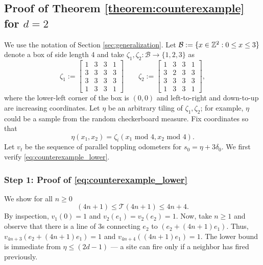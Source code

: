 \documentclass[12pt]{amsart}
\begin{document}
\subsection{Proof of Theorem \ref{theorem:counterexample} for \texorpdfstring{$d=2$}{d=2}} \label{sec:counterexample_2D}
We use the notation of Section \ref{sec:generalization}.  Let $\mathcal{B} := \{ x \in \mathbb{Z}^2 : 0 \leq x \leq 3\}$
denote a box of side length 4 and take $\zeta_1,\zeta_2: \mathcal{B} \to \{1,2, 3\}$ as
\[
\zeta_1 := 
\begin{bmatrix}
1 & 3 & 3 & 1 \\
3 & 3 & 3 & 3 \\
3 & 3 & 3 & 3  \\
1 & 3 & 3 & 1
\end{bmatrix}
\qquad 
\zeta_2 := 
\begin{bmatrix}
1 & 3 & 3 & 1 \\
3 & 2 & 3 & 3 \\
3 & 3 & 3 & 3  \\
1 & 3 & 3 & 1
\end{bmatrix}, 
\]
where the lower-left corner of the box is $(0,0)$ and left-to-right and down-to-up are increasing coordinates.
Let $\eta$ be an arbitrary tiling of $\zeta_1, \zeta_2$; for example, $\eta$ could be a sample from the 
random checkerboard measure. Fix coordinates so that 
\[
\eta(x_1, x_2) = \zeta_i(x_1 \mbox{ mod }  4, x_2  \mbox{ mod }  4).
\]
Let $v_t$ be the sequence of parallel toppling odometers for $s_0 = \eta + 3  \delta_0$. We first verify \eqref{eq:counterexample_lower}.

\subsubsection*{Step 1: Proof of \eqref{eq:counterexample_lower}}
We show for all $n \geq 0$
\begin{equation}
(4 n + 1) \leq \mathcal{T}(4 n + 1) \leq 4 n + 4.
\end{equation} 
By inspection, $v_1(0) = 1$ and $v_2(e_1) = v_2(e_2) = 1$. Now, take $n \geq 1$
and observe that there is a line of 3s connecting $e_2$ to $(e_2 + (4 n + 1)e_1)$.
Thus, $v_{4 n+3}(e_2 + (4 n + 1)e_1) = 1$ and $v_{4 n+4}( (4 n + 1)e_1) = 1$.
The lower bound is immediate from $\eta \leq (2d - 1)$ --- a site can fire only if a neighbor has fired previously.
\end{document}
